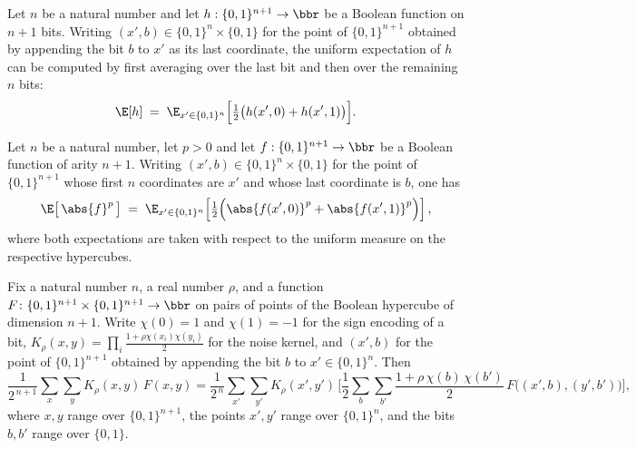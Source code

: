 \begin{lemma}
\leanok
{}
\label{BooleanAnalysis.Hypercontractivity.expect_succ_eq_iterated}
Let $n$ be a natural number and let $h : \{0,1\}^{n+1} \to \bbr$ be a Boolean function
on $n+1$ bits. Writing $(x', b)
\in \{0,1\}^n \times \{0,1\}$ for the point of $\{0,1\}^{n+1}$ obtained by appending the
bit $b$ to $x'$ as its last coordinate, the uniform expectation of $h$ can be computed
by first averaging over the last bit and then over the remaining $n$ bits:
\[
  \E[h] \;=\; \E_{x' \in \{0,1\}^n}\Bigl[\tfrac12\bigl(h(x', 0) + h(x', 1)\bigr)\Bigr].
\]
\end{lemma}

\begin{lemma}
\leanok
{}
\label{BooleanAnalysis.Hypercontractivity.norm_collapse_rpow}
Let $n$ be a natural number, let $p > 0$ and let $f : \{0,1\}^{n+1} \to \bbr$ be a
Boolean function of arity $n+1$.
Writing $(x', b) \in \{0,1\}^n \times \{0,1\}$ for the point of $\{0,1\}^{n+1}$ whose
first $n$ coordinates are $x'$ and whose last coordinate is $b$, one has
\[
  \E\bigl[\,\abs{f}^p\,\bigr]
  \;=\;
\E_{x' \in \{0,1\}^n}\!\left[\tfrac12\Bigl(\abs{f(x', 0)}^p + \abs{f(x',
1)}^p\Bigr)\right],
\]
where both expectations are taken with respect to the uniform measure on the respective
hypercubes.
\end{lemma}

\begin{lemma}
\leanok
{}
\label{BooleanAnalysis.Hypercontractivity.weighted_sum_succ_decomp}
Fix a natural number $n$, a real number $\rho$, and a function $F \colon \{0,1\}^{n+1}
\times \{0,1\}^{n+1} \to
\bbr$ on pairs of points of the Boolean hypercube of dimension $n+1$. Write $\chi(0)=1$
and $\chi(1)=-1$ for
the sign encoding of a bit, $K_\rho(x,y)=\prod_i\frac{1+\rho\chi(x_i)\chi(y_i)}{2}$ for
the noise kernel, and
$(x',b)$ for the point of $\{0,1\}^{n+1}$ obtained by appending the bit $b$
to $x' \in \{0,1\}^n$. Then
\[
  \frac{1}{2^{\,n+1}}\sum_{x}\sum_{y} K_\rho(x,y)\, F(x,y)
  =
  \frac{1}{2^{\,n}}\sum_{x'}\sum_{y'} K_\rho(x',y')\,
  \Biggl[\frac12 \sum_{b}\sum_{b'} \frac{1+\rho\,\chi(b)\,\chi(b')}{2}\,
  F\bigl((x',b),(y',b')\bigr)\Biggr],
\]
where $x,y$ range over $\{0,1\}^{n+1}$, the points $x',y'$ range over $\{0,1\}^{n}$, and
the bits $b,b'$ range over $\{0,1\}$.
\end{lemma}

